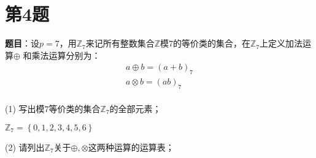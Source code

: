 \section{第4题}

\textbf{题目}：设$p=7$，用$\mathbb{Z}_7$来记所有整数集合$\mathbb{Z}$模$7$的等价类的集合，在$\mathbb{Z}_7$上定义加法运算$\oplus$
和乘法运算分别为：
\begin{equation}
    \begin{aligned}
        a \oplus b= (a+b)_7\\
        a \otimes b = (ab)_7\\
    \end{aligned}
\end{equation}

(1) 写出模$7$等价类的集合$\mathbb{Z}_7$的全部元素；

\begin{Solution}
    $\mathbb{Z}_7 = \left\{0,1,2,3,4,5,6\right\}$
\end{Solution}

(2) 请列出$\mathbb{Z}_7$关于$\oplus,\otimes$这两种运算的运算表；

